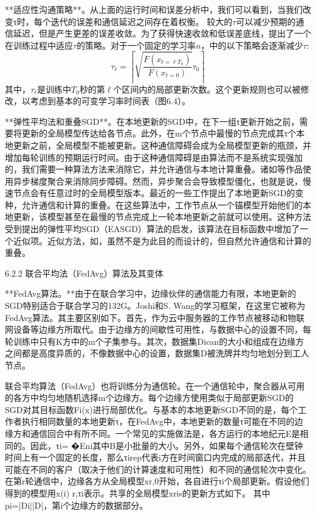 **适应性沟通策略**。从上面的运行时间和误差分析中，我们可以看到，当我们改变τ时，每个迭代的误差和通信延迟之间存在着权衡。 较大的$\tau$可以减少预期的通信延迟，但是产生更差的误差收敛。为了获得快速收敛和低误差底线，提出了一个在训练过程中适应$\tau$的策略。对于一个固定的学习率$n$，中的以下策略会逐渐减少$\tau$:
$$
\tau_{\ell} = \left \lceil \sqrt{\frac{F(x_{t=\ell T_{0}})}{F(x_{t=0})}}\tau_{0} \right \rceil
$$
其中，$\tau_{\ell}$是训练中$T_{0}$秒的第$\ell$个区间内的局部更新次数。这个更新规则也可以被修改，以考虑到基本的可变学习率时间表（图6.4）。

**弹性平均法和重叠SGD**。在本地更新的SGD中，在下一组τ更新开始之前，需要将更新的全局模型传达给各节点。此外，在m个节点中最慢的节点完成其τ个本地更新之前，全局模型不能被更新。这种通信障碍会成为全局模型更新的瓶颈，并增加每轮训练的预期运行时间。由于这种通信障碍是由算法而不是系统实现强加的，我们需要一种算法方法来消除它，并允许通信与本地计算重叠。诸如等作品使用异步梯度聚合来消除同步障碍。然而，异步聚合会导致模型僵化，也就是说，慢速节点会有任意过时的全局模型版本。最近的一些工作提出了本地更新SGD的变种，允许通信和计算的重叠。在这些算法中，工作节点从一个锚模型开始他们的本地更新，该模型甚至在最慢的节点完成上一轮本地更新之前就可以使用。这种方法受到提出的弹性平均SGD（EASGD）算法的启发，该算法在目标函数中增加了一个近似项。近似方法，如，虽然不是为此目的而设计的，但自然允许通信和计算的重叠。

6.2.2 联合平均法（FedAvg）算法及其变体

**FedAvg算法。**由于在联合学习中，边缘伙伴的通信能力有限，本地更新的SGD特别适合于联合学习的132G。Joshi和S. Wang的学习框架，在这里它被称为FedAvg算法。其主要区别如下。首先，作为云中服务器的工作节点被移动和物联网设备等边缘方所取代。由于边缘方的间歇性可用性，与数据中心的设置不同，每轮训练中只有K方中的m个子集参与。其次，数据集Dican的大小和组成在边缘方之间都是高度异质的，不像数据中心的设置，数据集D被洗牌并均匀地划分到工人节点。

联合平均算法（FedAvg）也将训练分为通信轮。在一个通信轮中，聚合器从可用的各方中均匀地随机选择m个边缘方。每个边缘方使用类似于局部更新SGD的SGD对其目标函数Fi(x)进行局部优化。与基本的本地更新SGD不同的是，每个工作者执行相同数量的本地更新τ，在FedAvg中，本地更新的数量τ可能在不同的边缘方和通信回合中有所不同。一个常见的实施做法是，各方运行的本地纪元E是相同的。因此，τi= �Eni其中B是小批量的大小。另外，如果每个通信轮次在壁钟时间上有一个固定的长度，那么τirep代表i方在时间窗口内完成的局部迭代，并且可能在不同的客户（取决于他们的计算速度和可用性）和不同的通信轮次中变化。在第r轮通信中，边缘各方从全局模型xr,0开始，各自进行τi个局部更新。假设他们得到的模型用x(i) r,τi表示。共享的全局模型xris的更新方式如下。
其中pi=|Di||D|，第i个边缘方的数据部分。

